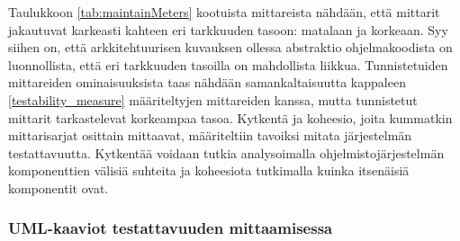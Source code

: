 \documentclass[finnish]{tktltiki2}
\numberwithin{table}{section}
\theoremstyle{definition}
\theoremstyle{remark}
\begin{document}
\begin{table}[H]
	\centering
	\setlength{\extrarowheight}{4pt}%
\end{table}

\newpage

\noindent
Taulukkoon \ref{tab:maintainMeters} kootuista mittareista nähdään, että mittarit jakautuvat karkeasti kahteen eri tarkkuuden tasoon: matalaan ja korkeaan. Syy siihen on, että arkkitehtuurisen kuvauksen ollessa abstraktio ohjelmakoodista on luonnollista, että eri tarkkuuden tasoilla on mahdollista liikkua. Tunnistetuiden mittareiden ominaisuuksista taas nähdään samankaltaisuutta kappaleen \ref{testability_measure} määriteltyjen mittareiden kanssa, mutta tunnistetut mittarit tarkastelevat korkeampaa tasoa. Kytkentä ja koheesio, joita kummatkin mittarisarjat osittain mittaavat,  määriteltiin tavoiksi mitata järjestelmän testattavuutta. Kytkentää voidaan tutkia analysoimalla ohjelmistojärjestelmän komponenttien välisiä suhteita ja koheesiota tutkimalla kuinka itsenäisiä komponentit ovat.

\subsubsection{UML-kaaviot testattavuuden mittaamisessa} \label{uml_arch_test}
\end{document}
